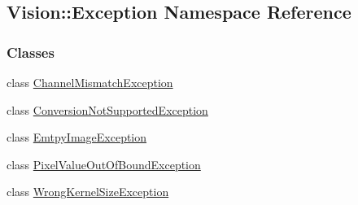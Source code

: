 \hypertarget{namespace_vision_1_1_exception}{}\subsection{Vision\+:\+:Exception Namespace Reference}
\label{namespace_vision_1_1_exception}
\subsubsection*{Classes}
\begin{DoxyCompactItemize}
\item 
class \hyperlink{class_vision_1_1_exception_1_1_channel_mismatch_exception}{Channel\+Mismatch\+Exception}
\item 
class \hyperlink{class_vision_1_1_exception_1_1_conversion_not_supported_exception}{Conversion\+Not\+Supported\+Exception}
\item 
class \hyperlink{class_vision_1_1_exception_1_1_emtpy_image_exception}{Emtpy\+Image\+Exception}
\item 
class \hyperlink{class_vision_1_1_exception_1_1_pixel_value_out_of_bound_exception}{Pixel\+Value\+Out\+Of\+Bound\+Exception}
\item 
class \hyperlink{class_vision_1_1_exception_1_1_wrong_kernel_size_exception}{Wrong\+Kernel\+Size\+Exception}
\end{DoxyCompactItemize}
